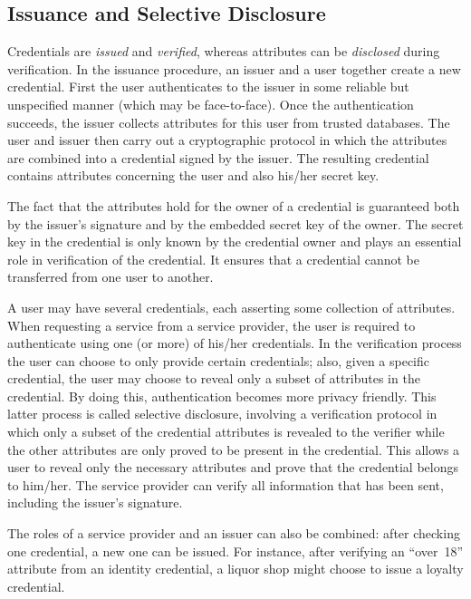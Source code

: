 \subsection{Issuance and Selective Disclosure}

Credentials are \emph{issued} and \emph{verified}, whereas attributes can be
\emph{disclosed} during verification. In the issuance procedure, an issuer and
a user together create a new credential. First the user authenticates to the
issuer in some reliable but unspecified manner (which may be face-to-face). Once
the authentication succeeds, the issuer collects attributes for this user from
trusted databases. The user and issuer then carry out a cryptographic protocol
in which the attributes are combined into a credential signed by the issuer. The
resulting credential contains attributes concerning the user and also his/her
secret key.

The fact that the attributes hold for the owner of a credential is guaranteed
both by the issuer's signature and by the embedded secret key of the owner. The
secret key in the credential is only known by the credential owner and plays an
essential role in verification of the credential. It ensures that a credential
cannot be transferred from one user to another.

A user may have several credentials, each asserting some collection of
attributes. When requesting a service from a service provider, the user is
required to authenticate using one (or more) of his/her credentials. In the
verification process the user can choose to only provide certain credentials;
also, given a specific credential, the user may choose to reveal only a subset
of attributes in the credential. By doing this, authentication becomes more
privacy friendly. This latter process is called selective disclosure, involving
a verification protocol in which only a subset of the credential attributes is
revealed to the verifier while the other attributes are only proved to be
present in the credential. This allows a user to reveal only the necessary
attributes and prove that the credential belongs to him/her. The service
provider can verify all information that has been sent, including the issuer's
signature.

The roles of a service provider and an issuer can also be combined: after
checking one credential, a new one can be issued. For instance, after verifying
an ``over~18'' attribute from an identity credential, a liquor shop might choose
to issue a loyalty credential.

